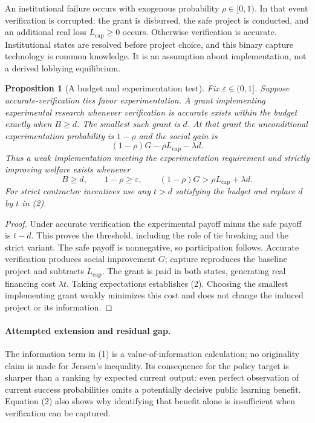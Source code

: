 \documentclass[11pt]{article}
\newtheorem{proposition}[theorem]{Proposition}
\theoremstyle{definition}
\begin{document}
An institutional failure occurs with exogenous probability $\rho\in[0,1)$. In that event verification is corrupted: the grant is disbursed, the safe project is conducted, and an additional real loss $L_{\mathrm{cap}}\geq0$ occurs. Otherwise verification is accurate. Institutional states are resolved before project choice, and this binary capture technology is common knowledge. It is an assumption about implementation, not a derived lobbying equilibrium.

\begin{proposition}[A budget and experimentation test]
Fix $\varepsilon\in(0,1]$. Suppose accurate-verification ties favor experimentation. A grant implementing experimental research whenever verification is accurate exists within the budget exactly when $B\geq d$. The smallest such grant is $d$. At that grant the unconditional experimentation probability is $1-\rho$ and the social gain is
\[
 (1-\rho)G-\rho L_{\mathrm{cap}}-\lambda d.
 \tag{2}
\]
Thus a weak implementation meeting the experimentation requirement and strictly improving welfare exists whenever
\[
 B\geq d,\qquad 1-\rho\geq\varepsilon,
 \qquad (1-\rho)G>\rho L_{\mathrm{cap}}+\lambda d.
\]
For strict contractor incentives use any $t>d$ satisfying the budget and replace $d$ by $t$ in (2).
\end{proposition}
\begin{proof}
Under accurate verification the experimental payoff minus the safe payoff is $t-d$. This proves the threshold, including the role of tie breaking and the strict variant. The safe payoff is nonnegative, so participation follows. Accurate verification produces social improvement $G$; capture reproduces the baseline project and subtracts $L_{\mathrm{cap}}$. The grant is paid in both states, generating real financing cost $\lambda t$. Taking expectations establishes (2). Choosing the smallest implementing grant weakly minimizes this cost and does not change the induced project or its information.
\end{proof}

\paragraph{Attempted extension and residual gap.}
The information term in (1) is a value-of-information calculation; no originality claim is made for Jensen's inequality. Its consequence for the policy target is sharper than a ranking by expected current output: even perfect observation of current success probabilities omits a potentially decisive public learning benefit. Equation (2) also shows why identifying that benefit alone is insufficient when verification can be captured.
\end{document}

